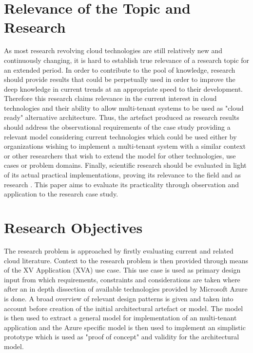 \section{Relevance of the Topic and Research}

As most research revolving cloud technologies are still relatively new and continuously changing, it is hard to establish true relevance of a research topic for an extended period. In order to contribute to the pool of knowledge, research should provide results that could be perpetually used in order to improve the deep knowledge in current trends at an appropriate speed to their development. Therefore this research claims relevance in the current interest in cloud technologies and their ability to allow multi-tenant systems to be used as "cloud ready" alternative architecture. Thus, the artefact produced as research results should address the observational requirements of the case study providing a relevant model considering current technologies which could be used either by organizations wishing to implement a multi-tenant system with a similar context or other researchers that wish to extend the model for other technologies, use cases or problem domains. Finally, scientific research should be evaluated in light of its actual practical implementations, proving its relevance to the field and as research \cite{Hevner2004}. This paper aims to evaluate its practicality through observation and application to the research case study.


\section{Research Objectives}

The research problem is approached by firstly evaluating current and related cloud literature. Context to the research problem is then provided through means of the XV Application (XVA) use case. This use case is used as primary design input from which requirements, constraints and considerations are taken where after an in depth dissection of available technologies provided by Microsoft Azure is done. A broad overview of relevant design patterns is given and taken into account before creation of the initial architectural artefact or model. The model is then used to extract a general model for implementation of an multi-tenant application and the Azure specific model is then used to implement an simplistic prototype which is used as "proof of concept" and validity for the architectural model.





